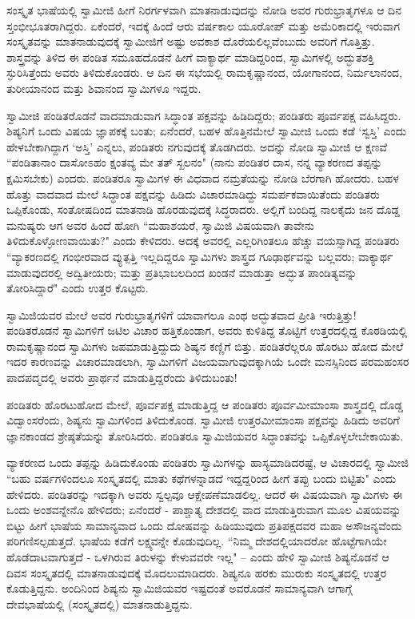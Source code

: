 ಸಂಸ್ಕೃತ ಭಾಷೆಯಲ್ಲಿ ಸ್ವಾಮೀಜಿ ಹೀಗೆ ನಿರರ್ಗಳವಾಗಿ ಮಾತನಾಡುವುದನ್ನು ನೋಡಿ ಅವರ ಗುರುಭ್ರಾತೃಗಳೂ ಆ ದಿನ ಸ್ತಂಭೀಭೂತರಾಗಿದ್ದರು. ಏಕೆಂದರೆ, ಇದಕ್ಕೆ ಹಿಂದೆ ಆರು ವರ್ಷಕಾಲ ಯೂರೋಪ್ ಮತ್ತು ಅಮೆರಿಕಾದಲ್ಲಿ ಇರುವಾಗ ಸಂಸ್ಕೃತವನ್ನು ಮಾತನಾಡುವುದಕ್ಕೆ ಸ್ವಾಮೀಜಿಗೆ ಅಷ್ಟು ಅವಕಾಶ ದೊರೆಯಲಿಲ್ಲವೆಂಬುದು ಅವರಿಗೆ ಗೊತ್ತಿತ್ತು. ಶಾಸ್ತ್ರವನ್ನು ತಿಳಿದ ಈ ಪಂಡಿತ ಸಮೂಹದೊಡನೆ ಹೀಗೆ ವಾಕ್ಯಾರ್ಥ ಮಾಡಿದ್ದರಿಂದ, ಸ್ವಾಮಿಗಳಲ್ಲಿ ಅದ್ಭುತಶಕ್ತಿ ಸ್ಫುರಿಸಿತ್ತೆಂದು ಅವರು ತಿಳಿದುಕೊಂಡರು. ಆ ದಿನ ಈ ಸಭೆಯಲ್ಲಿ ರಾಮಕೃಷ್ಣಾನಂದ, ಯೋಗಾನಂದ, ನಿರ್ಮಲಾನಂದ, ತುರೀಯಾನಂದ ಮತ್ತು ಶಿವಾನಂದ ಸ್ವಾಮಿಗಳೂ ಇದ್ದರು.

ಸ್ವಾಮೀಜಿ ಪಂಡಿತರೊಡನೆ ವಾದಮಾಡುವಾಗ ಸಿದ್ಧಾಂತ ಪಕ್ಷವನ್ನು ಹಿಡಿದಿದ್ದರು; ಪಂಡಿತರು ಪೂರ್ವಪಕ್ಷ ವಹಿಸಿದ್ದರು. ಶಿಷ್ಯನಿಗೆ ಒಂದು ವಿಷಯ ಜ್ಞಾಪಕಕ್ಕೆ ಬಂತು; ಏನೆಂದರೆ, ಬಹಳ ಹೊತ್ತಿನಮೇಲೆ ಸ್ವಾಮೀಜಿ ಒಂದು ಕಡೆ ‘ಸ್ವಸ್ತಿ’ ಎಂದು ಹೇಳಬೇಕಾಗಿದ್ದಾಗ ‘ಅಸ್ತಿ’ ಎನ್ನಲು, ಪಂಡಿತರು ನಗುವುದಕ್ಕೆ ತೊಡಗಿದರು. ಅದನ್ನು ನೋಡಿ ಸ್ವಾಮೀಜಿ ಆ ಕ್ಷಣವೆ “ಪಂಡಿತಾನಾಂ ದಾಸೋಽಹಂ ಕ್ಷಂತವ್ಯ ಮೇ ತತ್ ಸ್ಖಲನಂ" (ನಾನು ಪಂಡಿತರ ದಾಸ, ನನ್ನ ವ್ಯಾಕರಣದ ತಪ್ಪನ್ನು ಕ್ಷಮಿಸಬೇಕು) ಎಂದರು. ಪಂಡಿತರೂ ಸ್ವಾಮಿಗಳ ಈ ವಿಧವಾದ ನಮ್ರತೆಯನ್ನು ನೋಡಿ ಬೆರಗಾಗಿ ಹೋದರು. ಬಹಳ ಹೊತ್ತು ವಾದವಾದ ಮೇಲೆ ಸಿದ್ಧಾಂತ ಪಕ್ಷವನ್ನು ಹಿಡಿದು ವಿಚಾರಮಾಡಿದ್ದು ಸಮರ್ಪಕವಾಯಿತೆಂದು ಪಂಡಿತರು ಒಪ್ಪಿಕೊಂಡು, ಸಂತೋಷದಿಂದ ಮಾತನಾಡಿ ಹೊರಡುವುದಕ್ಕೆ ಸಿದ್ಧರಾದರು. ಅಲ್ಲಿಗೆ ಬಂದಿದ್ದ ನಾಲಕೈದು ಜನ ದೊಡ್ಡ ಮನುಷ್ಯರು ಆಗ ಅವರ ಹಿಂದೆ ಹೋಗಿ “ಮಹಾಶಯರೆ, ಸ್ವಾಮಿಜಿ ವಿಷಯವಾಗಿ ತಾವೇನು ತಿಳಿದುಕೊಳ್ಳೋಣವಾಯಿತು?" ಎಂದು ಕೇಳಿದರು. ಅದಕ್ಕೆ ಅವರಲ್ಲಿ ಎಲ್ಲರಿಗಿಂತಲೂ ಹೆಚ್ಚು ವಯಸ್ಸಾಗಿದ್ದ ಪಂಡಿತರು “ವ್ಯಾಕರಣದಲ್ಲಿ ಗಂಭೀರವಾದ ವ್ಯುತ್ಪತ್ತಿ ಇಲ್ಲದಿದ್ದರೂ ಸ್ವಾಮಿಗಳು ಶಾಸ್ತ್ರದ ಗೂಢಾರ್ಥವನ್ನು ಬಲ್ಲವರು; ವಾಕ್ಯಾರ್ಥ ಮಾಡುವುದರಲ್ಲಿ ಅದ್ವಿತೀಯರು; ಮತ್ತು ಪ್ರತಿಭಾಬಲದಿಂದ ಖಂಡನೆ ಮಾಡುತ್ತಾ ಅದ್ಭುತ ಪಾಂಡಿತ್ಯವನ್ನು ತೋರಿಸಿದ್ದಾರೆ" ಎಂದು ಉತ್ತರ ಕೊಟ್ಟರು.

ಸ್ವಾಮಿಜಿಯವರ ಮೇಲೆ ಅವರ ಗುರುಭ್ರಾತೃಗಳಿಗೆ ಯಾವಾಗಲೂ ಎಂಥ ಅದ್ಭುತವಾದ ಪ್ರೀತಿ ಇರುತ್ತಿತ್ತು! ಪಂಡಿತರೊಡನೆ ಸ್ವಾಮಿಗಳಿಗೆ ಜಟಿಲ ವಿಚಾರ ಹತ್ತಿಕೊಂಡಾಗ, ಅವರು ಕುಳಿತಿದ್ದ ತೊಟ್ಟಿಗೆ ಉತ್ತರದಲ್ಲಿದ್ದ ಕೊಠಡಿಯಲ್ಲಿ ರಾಮಕೃಷ್ಣಾನಂದ ಸ್ವಾಮಿಗಳು ಜಪಮಾಡುತ್ತಿದ್ದುದು ಶಿಷ್ಯನ ಕಣ್ಣಿಗೆ ಬಿತ್ತು. ಪಂಡಿತರೆಲ್ಲರೂ ಹೊರಟು ಹೋದ ಮೇಲೆ ಇದರ ಕಾರಣವನ್ನು ವಿಚಾರಮಾಡಲಾಗಿ, ಸ್ವಾಮಿಗಳಿಗೆ ವಿಜಯವಾಗುವುದಕ್ಕಾಗಿಯೆ ಒಂದೇ ಮನಸ್ಸಿನಿಂದ ಪರಮಹಂಸರ ಪಾದಪದ್ಮದಲ್ಲಿ ಅವರು ಪ್ರಾರ್ಥನೆ ಮಾಡುತ್ತಿದ್ದರೆಂದು ತಿಳಿದುಬಂತು!

ಪಂಡಿತರು ಹೊರಟುಹೋದ ಮೇಲೆ, ಪೂರ್ವಪಕ್ಷ ಮಾಡುತ್ತಿದ್ದ ಆ ಪಂಡಿತರು ಪೂರ್ವಮೀಮಾಂಸಾ ಶಾಸ್ತ್ರದಲ್ಲಿ ದೊಡ್ಡ ವಿದ್ವಾಂಸರೆಂದು, ಶಿಷ್ಯನು ಸ್ವಾಮಿಗಳಿಂದ ತಿಳಿದುಕೊಂಡ. ಸ್ವಾಮೀಜಿ ಉತ್ತರಮೀಮಾಂಸಾ ಪಕ್ಷವನ್ನು ಹಿಡಿದು ಅವರಿಗೆ ಜ್ಞಾನಕಾಂಡದ ಶ್ರೇಷ್ಠತೆಯನ್ನು ತೋರಿಸಿದರು. ಪಂಡಿತರೂ ಸ್ವಾಮಿಜಿಯವರ ಸಿದ್ಧಾಂತವನ್ನು ಒಪ್ಪಿಕೊಳ್ಳಲೇಬೇಕಾಯಿತು.

ವ್ಯಾಕರಣದ ಒಂದು ತಪ್ಪನ್ನು ಹಿಡಿದುಕೊಂಡು ಪಂಡಿತರು ಸ್ವಾಮಿಗಳನ್ನು ಹಾಸ್ಯಮಾಡಿದರಷ್ಟೆ, ಆ ವಿಚಾರದಲ್ಲಿ ಸ್ವಾಮೀಜಿ “ಬಹು ವರ್ಷಗಳಿಂದಲೂ ಸಂಸ್ಕೃತದಲ್ಲಿ ಮಾತು ಕಥೆಗಳನ್ನಾಡದೆ ಇದ್ದದ್ದರಿಂದ ಹೀಗೆ ತಪ್ಪು ಬಂದು ಬಿಟ್ಟಿತು" ಎಂದು ಹೇಳಿದರು. ಪಂಡಿತರನ್ನು ಇದಕ್ಕಾಗಿ ಅವರು ಸ್ವಲ್ಪವೂ ಆಕ್ಷೇಪಣೆಮಾಡಲಿಲ್ಲ. ಆದರೆ ಈ ವಿಷಯವಾಗಿ ಸ್ವಾಮಿಗಳು ಈ ಒಂದು ಅಂಶವನ್ನೇನೊ ಹೇಳಿದರು; ಏನೆಂದರೆ - ಪಾಶ್ಚಾತ್ಯ ದೇಶದಲ್ಲಿ ವಾದ ಮಾಡುತ್ತಿರುವಾಗ ಮೂಲ ವಿಷಯವನ್ನು ಬಿಟ್ಟು ಹೀಗೆ ಭಾಷೆಯ ಸಾಮಾನ್ಯವಾದ ಒಂದು ದೋಷವನ್ನು ಹಿಡಿಯುವುದು ಪ್ರತಿಪಕ್ಷದವರ ಮಹಾ ಅಸೌಜನ್ಯವೆಂದು ಪರಿಗಣಿಸಲ್ಪಡುತ್ತದೆ. ಭಾಷೆಯ ಕಡೆಗೆ ಲಕ್ಷ್ಯವನ್ನೇ ಕೊಡುವುದಿಲ್ಲ. “ನಿಮ್ಮ ದೇಶದಲ್ಲಿಯಾದರೋ ಹೊಟ್ಟೆಗಾಗಿಯೇ ಹೊಡೆದಾಟವಾಗುತ್ತದೆ - ಒಳಗಿರುವ ತಿರುಳನ್ನು ಕೇಳುವವರೇ ಇಲ್ಲ" – ಎಂದು ಹೇಳಿ ಸ್ವಾಮೀಜಿ ಶಿಷ್ಯನೊಡನೆ ಆ ದಿವಸ ಸಂಸ್ಕೃತದಲ್ಲಿ ಮಾತನಾಡುವುದಕ್ಕೆ ಮೊದಲುಮಾಡಿದರು. ಶಿಷ್ಯನೂ ಹರಕು ಮುರುಕು ಸಂಸ್ಕೃತದಲ್ಲಿ ಉತ್ತರ ಕೊಡುತ್ತಿದ್ದನು. ಅಂದಿನಿಂದ ಶಿಷ್ಯನು ಸ್ವಾಮಿಜಿಯವರ ಇಷ್ಟದಂತೆ ಅವರೊಡನೆ ಸಾಮಾನ್ಯವಾಗಿ ಆಗಾಗ್ಗೆ ದೇವಭಾಷೆಯಲ್ಲಿ (ಸಂಸ್ಕೃತದಲ್ಲಿ) ಮಾತನಾಡುತ್ತಿದ್ದನು.

